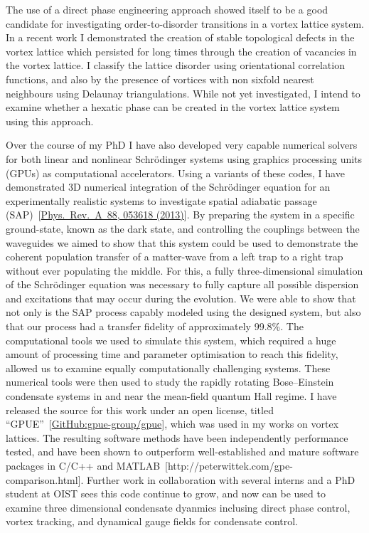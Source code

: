 \documentclass[12pt,a4paper,unicode]{moderncv}
\begin{document}
{The use of a direct phase engineering approach showed itself to be a good candidate for investigating order-to-disorder transitions in a vortex lattice system. In a recent work I demonstrated the creation of stable topological defects in the vortex lattice which persisted for long times through the creation of vacancies in the vortex lattice. I classify the lattice disorder using orientational correlation functions, and also by the presence of vortices with non sixfold nearest neighbours using Delaunay triangulations. While not yet investigated, I intend to examine whether a hexatic phase can be created in the vortex lattice system using this approach.

Over the course of my PhD I have also developed very capable numerical solvers for both linear and nonlinear Schr\"odinger systems using graphics processing units (GPUs) as computational accelerators. Using a variants of these codes, I have demonstrated 3D numerical integration of the Schr\"odinger equation for an experimentally realistic systems to investigate spatial adiabatic passage (SAP)~[\href{http://journals.aps.org/pra/abstract/10.1103/PhysRevA.88.053618}{Phys.~Rev.~A~88, 053618 (2013)}]. By preparing the system in a specific ground-state, known as the dark state, and controlling the couplings between the waveguides we aimed to show that this system could be used to demonstrate the coherent population transfer of a matter-wave from a left trap to a right trap without ever populating the middle. For this, a fully three-dimensional simulation of the Schr\"odinger equation was necessary to fully capture all possible dispersion and excitations that may occur during the evolution. We were able to show that not only is the SAP process capably modeled using the designed system, but also that our process had a transfer fidelity of approximately 99.8\%. The computational tools we used to simulate this system, which required a huge amount of processing time and parameter optimisation to reach this fidelity, allowed us to examine equally computationally challenging systems. These numerical tools were then used to study the rapidly rotating Bose--Einstein condensate systems in and near the mean-field quantum Hall regime. I have released the source for this work under an open license, titled ``GPUE''~[\href{https://github.com/gpue-group/gpue}{GitHub:gpue-group/gpue}], which was used in my works on vortex lattices. The resulting software methods have been independently performance tested, and have been shown to outperform well-established and mature software packages in C/C++ and \textsc{MATLAB}~[http://peterwittek.com/gpe-comparison.html]. Further work in collaboration with several interns and a PhD student at OIST sees this code continue to grow, and now can be used to examine three dimensional condensate dyanmics inclusing direct phase control, vortex tracking, and dynamical gauge fields for condensate control.
}

\makeletterclosing
\end{document}
